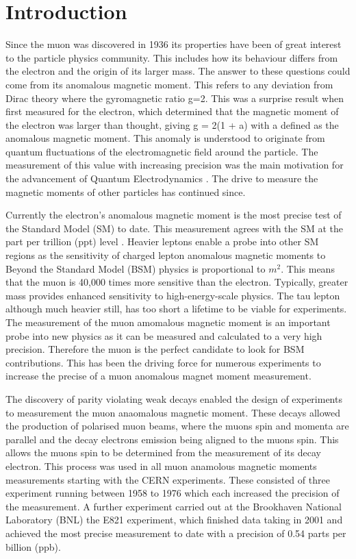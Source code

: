 
\chapter{Introduction} %

\label{Introduction} %

Since the muon was discovered in 1936\cite{cloudchamber} its properties have been of great interest to the particle physics community. This includes how its behaviour differs from the electron and the origin of its larger mass. The answer to these questions could come from its anomalous magnetic moment. This refers to any deviation from Dirac theory where the gyromagnetic ratio g=2. This was a surprise result when first measured for the electron, which determined that the magnetic moment of the electron was larger than thought, giving g = 2(1 + a) with a defined as the anomalous magnetic moment. This anomaly is understood to originate from quantum fluctuations of the electromagnetic field around the particle. The measurement of this value with increasing precision was the main motivation for the advancement of Quantum Electrodynamics \cite{Reference10}. The drive to measure the magnetic moments of other particles has continued since. 

Currently the electron's anomalous magnetic moment is the most precise test of the Standard Model (SM) to date. This measurement agrees with the SM at the part per trillion (ppt) level \cite{electronmagmom}. Heavier leptons enable a probe into other SM regions as the sensitivity of charged lepton anomalous magnetic moments to Beyond the Standard Model (BSM) physics is proportional to $m^2$. This means that the muon is 40,000 times more sensitive than the electron. Typically, greater mass provides enhanced sensitivity to high-energy-scale physics. The tau lepton although much heavier still, has too short a lifetime to be viable for experiments. The measurement of the muon amomalous magnetic moment is an important probe into new physics as it can be measured and calculated to a very high precision. Therefore the muon is the perfect candidate to look for BSM contributions. This has been the driving force for numerous experiments to increase the precise of a muon anomalous magnet moment measurement. 

The discovery of parity violating weak decays enabled the design of experiments to measurement the muon anaomalous magnetic moment. These decays allowed the production of polarised muon beams, where the muons spin and momenta are parallel and the decay electrons emission being aligned to the muons spin. This allows the muons spin to be determined from the measurement of its decay electron. This process was used in all muon anamolous magnetic moments measurements starting with the CERN experiments. These consisted of three experiment running between 1958 to 1976 which each increased the precision of the measurement. A further experiment carried out at the Brookhaven National Laboratory (BNL) the E821 experiment, which finished data taking in 2001 and achieved the most precise measurement to date with a precision of 0.54 parts per billion (ppb). 

